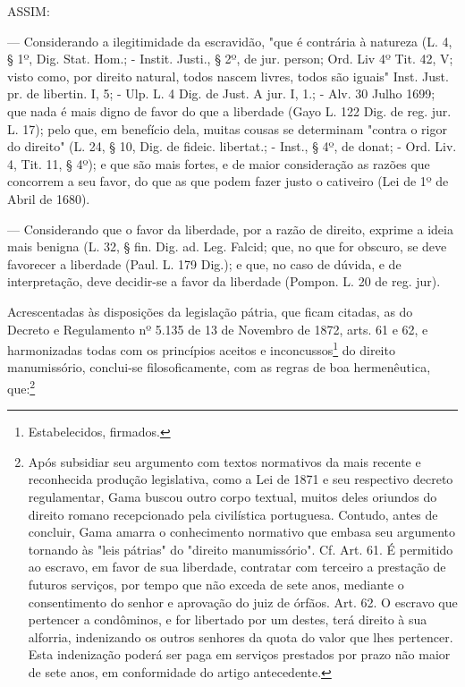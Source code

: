 ASSIM:

--- Considerando a ilegitimidade da escravidão, "que é contrária à
natureza (L. 4, § 1º, Dig. Stat. Hom.; - Instit. Justi., § 2º, de jur.
person; Ord. Liv 4º Tit. 42, V; visto como, por direito natural, todos
nascem livres, todos são iguais" Inst. Just. pr. de libertin. I, 5; -
Ulp. L. 4 Dig. de Just. A jur. I, 1.; - Alv. 30 Julho 1699; que nada é
mais digno de favor do que a liberdade (Gayo L. 122 Dig. de reg. jur. L.
17); pelo que, em benefício dela, muitas cousas se determinam "contra o
rigor do direito" (L. 24, § 10, Dig. de fideic. libertat.; - Inst., §
4º, de donat; - Ord. Liv. 4, Tit. 11, § 4º); e que são mais fortes, e de
maior consideração as razões que concorrem a seu favor, do que as que
podem fazer justo o cativeiro (Lei de 1º de Abril de 1680).

--- Considerando que o favor da liberdade, por a razão de direito,
exprime a ideia mais benigna (L. 32, § fin. Dig. ad. Leg. Falcid; que,
no que for obscuro, se deve favorecer a liberdade (Paul. L. 179 Dig.); e
que, no caso de dúvida, e de interpretação, deve decidir-se a favor da
liberdade (Pompon. L. 20 de reg. jur).

Acrescentadas às disposições da legislação pátria, que ficam citadas, as
do Decreto e Regulamento nº 5.135 de 13 de Novembro de 1872, arts. 61 e
62, e harmonizadas todas com os princípios aceitos e
inconcussos\footnote{Estabelecidos, firmados.} do direito
manumissório, conclui-se filosoficamente, com as regras de boa
hermenêutica, que:\footnote{Após subsidiar seu argumento com textos
  normativos da mais recente e reconhecida produção legislativa, como a
  Lei de 1871 e seu respectivo decreto regulamentar, Gama buscou outro
  corpo textual, muitos deles oriundos do direito romano recepcionado
  pela civilística portuguesa. Contudo, antes de concluir, Gama amarra o
  conhecimento normativo que embasa seu argumento tornando às "leis
  pátrias" do "direito manumissório". Cf. Art. 61. É permitido ao
  escravo, em favor de sua liberdade, contratar com terceiro a prestação
  de futuros serviços, por tempo que não exceda de sete anos, mediante o
  consentimento do senhor e aprovação do juiz de órfãos. Art. 62. O
  escravo que pertencer a condôminos, e for libertado por um destes,
  terá direito à sua alforria, indenizando os outros senhores da quota
  do valor que lhes pertencer. Esta indenização poderá ser paga em
  serviços prestados por prazo não maior de sete anos, em conformidade
  do artigo antecedente.}

